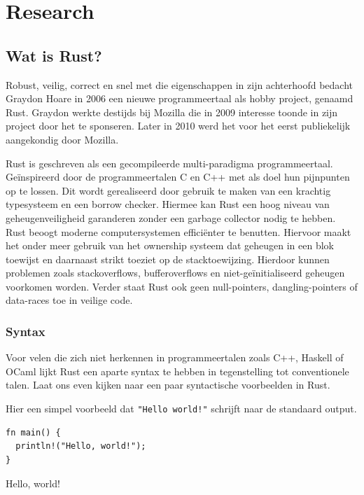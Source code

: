\chapter{Research}
\label{research}

\section{Wat is Rust?}

Robust, veilig, correct en snel met die eigenschappen in zijn achterhoofd bedacht Graydon Hoare in
2006 een nieuwe programmeertaal als hobby project, genaamd Rust. Graydon werkte destijds bij Mozilla
die in 2009 interesse toonde in zijn project door het te sponseren. Later in 2010 werd het voor het
eerst publiekelijk aangekondig door Mozilla.

Rust is geschreven als een gecompileerde multi-paradigma programmeertaal. Geïnspireerd door de
programmeertalen C en C++ met als doel hun pijnpunten op te lossen. Dit wordt gerealiseerd door
gebruik te maken van een krachtig typesysteem en een borrow checker. Hiermee kan Rust een hoog
niveau van geheugenveiligheid garanderen zonder een garbage collector nodig te hebben. Rust beoogt
moderne computersystemen efficiënter te benutten. Hiervoor maakt het onder meer gebruik van het
ownership systeem dat geheugen in een blok toewijst en daarnaast strikt toeziet op de
stacktoewijzing. Hierdoor kunnen problemen zoals stackoverflows, bufferoverflows en
niet-geïnitialiseerd geheugen voorkomen worden. Verder staat Rust ook geen null-pointers,
dangling-pointers of data-races toe in veilige code.

\subsection{Syntax} 

Voor velen die zich niet herkennen in programmeertalen zoals C++, Haskell of OCaml lijkt Rust een
aparte syntax te hebben in tegenstelling tot conventionele talen. Laat ons even kijken naar een paar
syntactische voorbeelden in Rust.


Hier een simpel voorbeeld dat \texttt{"Hello world!"} schrijft naar de standaard output.

\begin{listing}[h]
\begin{verbatim}
fn main() {
  println!("Hello, world!");
}
\end{verbatim}
\caption{Hello, world!}
\end{listing}

